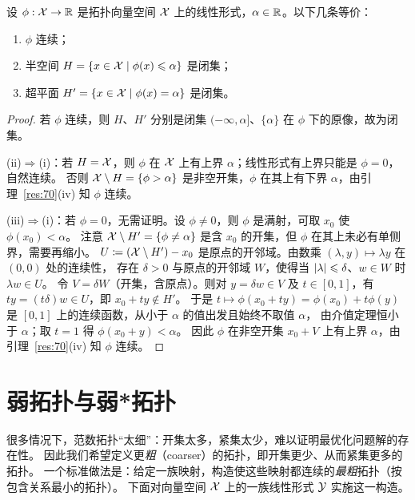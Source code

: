 \begin{lemma}[闭半空间]
\label{res:71}
设 $\phi:\mathcal{X}\to\mathbb{R}$ 是拓扑向量空间 $\mathcal{X}$ 上的线性形式，$\alpha\in\mathbb{R}$。以下几条等价：
\begin{enumerate}[label=(\roman*)]
  \item $\phi$ 连续；
  \item 半空间 $H=\{x\in\mathcal{X}\mid\phi(x)\leqslant\alpha\}$ 是闭集；
  \item 超平面 $H'=\{x\in\mathcal{X}\mid\phi(x)=\alpha\}$ 是闭集。
\end{enumerate}
\end{lemma}

\begin{proof}
若 $\phi$ 连续，则 $H$、$H'$ 分别是闭集 $(-\infty,\alpha]$、$\{\alpha\}$ 在 $\phi$ 下的原像，故为闭集。

(ii)$\Rightarrow$(i)：若 $H=\mathcal{X}$，则 $\phi$ 在 $\mathcal{X}$ 上有上界 $\alpha$；线性形式有上界只能是 $\phi=0$，自然连续。
否则 $\mathcal{X}\setminus H=\{\phi>\alpha\}$ 是非空开集，$\phi$ 在其上有下界 $\alpha$，由引理~\ref{res:70}(iv) 知 $\phi$ 连续。

(iii)$\Rightarrow$(i)：若 $\phi=0$，无需证明。设 $\phi\neq0$，则 $\phi$ 是满射，可取 $x_0$ 使 $\phi(x_0)<\alpha$。
注意 $\mathcal{X}\setminus H'=\{\phi\neq\alpha\}$ 是含 $x_0$ 的开集，但 $\phi$ 在其上未必有单侧界，需要再缩小。
$U\coloneqq(\mathcal{X}\setminus H')-x_0$ 是原点的开邻域。由数乘 $(\lambda,y)\mapsto\lambda y$ 在 $(0,0)$ 处的连续性，
存在 $\delta>0$ 与原点的开邻域 $W$，使得当 $\lvert \lambda\rvert\leqslant\delta$、$w\in W$ 时 $\lambda w\in U$。
令 $V=\delta W$（开集，含原点）。则对 $y=\delta w\in V$ 及 $t\in[0,1]$，有 $ty=(t\delta)w\in U$，即 $x_0+ty\notin H'$。
于是 $t\mapsto\phi(x_0+ty)=\phi(x_0)+t\phi(y)$ 是 $[0,1]$ 上的连续函数，从小于 $\alpha$ 的值出发且始终不取值 $\alpha$，
由介值定理恒小于 $\alpha$；取 $t=1$ 得 $\phi(x_0+y)<\alpha$。
因此 $\phi$ 在非空开集 $x_0+V$ 上有上界 $\alpha$，由引理~\ref{res:70}(iv) 知 $\phi$ 连续。
\end{proof}

\section{弱拓扑与弱*拓扑}

很多情况下，范数拓扑“太细”：开集太多，紧集太少，难以证明最优化问题解的存在性。
因此我们希望定义更\emph{粗}（coarser）的拓扑，即开集更少、从而紧集更多的拓扑。
一个标准做法是：给定一族映射，构造使这些映射都连续的\emph{最粗}拓扑（按包含关系最小的拓扑）。
下面对向量空间 $\mathcal{X}$ 上的一族线性形式 $\mathcal{Y}$ 实施这一构造。


